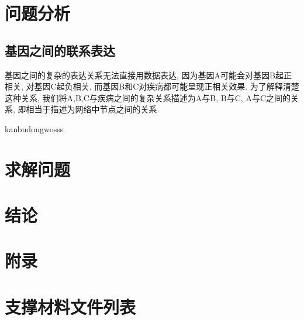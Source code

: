 \documentclass[zihao=-4]{ctexart}
\begin{document}
\section{问题分析}
\subsection{基因之间的联系表达}
基因之间的复杂的表达关系无法直接用数据表达, 因为基因A可能会对基因B起正相关, 对基因C起负相关, 而基因B和C对疾病都可能呈现正相关效果. 为了解释清楚这种关系, 我们将A,B,C与疾病之间的复杂关系描述为A与B, B与C, A与C之间的关系, 即相当于描述为网络中节点之间的关系.



kanbudong\cite{ranger}wosss
\section{求解问题}

\newpage
\section*{结论}


\newpage
\section*{附录}



\section*{支撑材料文件列表}
\end{document}
